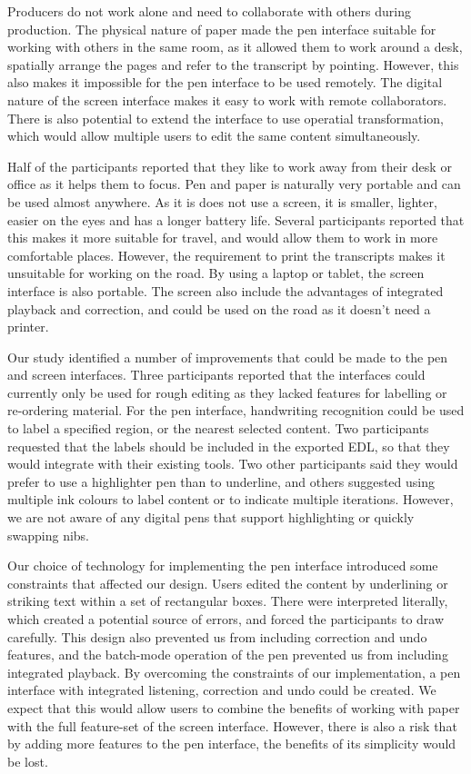 Producers do not work alone and need to collaborate with others during production. The physical nature of paper made
the pen interface suitable for working with others in the same room, as it allowed them to work around a desk,
spatially arrange the pages and refer to the transcript by pointing. However, this also makes it impossible for the pen
interface to be used remotely. The digital nature of the screen interface makes it easy to work with remote
collaborators. There is also potential to extend the interface to use operatial transformation, which would allow
multiple users to edit the same content simultaneously.

Half of the participants reported that they like to work away from their desk or office as it helps them to focus. Pen and
paper is naturally very portable and can be used almost anywhere. As it is does not use a screen, it is smaller,
lighter, easier on the eyes and has a longer battery life. Several participants reported that this makes it more
suitable for travel, and would allow them to work in more comfortable places. However, the requirement to print the
transcripts makes it unsuitable for working on the road. By using a laptop or tablet, the screen interface is also
portable. The screen also include the advantages of integrated playback and correction, and could be used on the road
as it doesn't need a printer.

Our study identified a number of improvements that could be made to the pen and screen interfaces. Three participants
reported that the interfaces could currently only be used for rough editing as they lacked features for labelling or
re-ordering material. For the pen interface, handwriting recognition could be used to label a specified region, or the
nearest selected content. Two participants requested that the labels should be included in the exported EDL, so that
they would integrate with their existing tools. Two other participants said they would prefer to use a highlighter pen
than to underline, and others suggested using multiple ink colours to label content or to indicate multiple iterations.
However, we are not aware of any digital pens that support highlighting or quickly swapping nibs.

Our choice of technology for implementing the pen interface introduced some constraints that affected our design.
Users edited the content by underlining or striking text within a set of rectangular boxes. There were interpreted
literally, which created a potential source of errors, and forced the participants to draw carefully. This design also
prevented us from including correction and undo features, and the batch-mode operation of the pen prevented us from
including integrated playback.  By overcoming the constraints of our implementation, a pen interface with integrated
listening, correction and undo could be created. We expect that this would allow users to combine the benefits of
working with paper with the full feature-set of the screen interface. However, there is also a risk that by adding more
features to the pen interface, the benefits of its simplicity would be lost.

